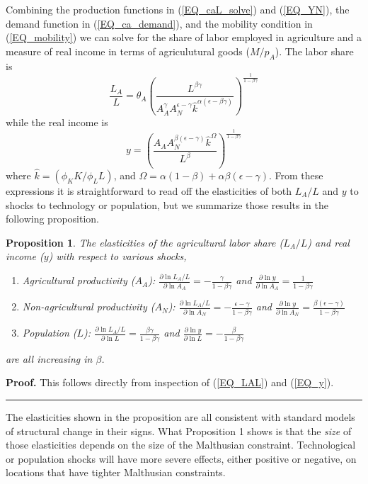 \documentclass[11pt]{article}
\newtheorem{proposition}{Proposition}
\newenvironment{proof}[1][Proof]{\noindent\textbf{#1.} }{\ \rule{0.5em}{0.5em}}
\begin{document}
Combining the production functions in (\ref{EQ_caL_solve}) and (\ref{EQ_YN}), the demand function in (\ref{EQ_ca_demand}), and the mobility condition in (\ref{EQ_mobility}) we can solve for the share of labor employed in agriculture and a measure of real income in terms of agriculutural goods ($M/p_A$). The labor share is
\begin{equation}
	\frac{L_A}{L} = \theta_A \left(\frac{L^{\beta\gamma}}{A_A^{\gamma} A_N^{\epsilon - \gamma} \hat{k}^{\alpha(\epsilon - \beta\gamma)}}\right)^{\frac{1}{1-\beta\gamma}} \label{EQ_LAL}
\end{equation}
while the real income is
\begin{equation}
	y = \left(\frac{A_A A_N^{\beta(\epsilon-\gamma)}\hat{k}^{\Omega}}{L^{\beta}} \right)^{\frac{1}{1-\beta\gamma}} \label{EQ_y}
\end{equation}
where $\hat{k} = (\phi_K K/\phi_L L)$, and $\Omega = \alpha(1-\beta) + \alpha\beta(\epsilon-\gamma)$. From these expressions it is straightforward to read off the elasticities of both $L_A/L$ and $y$ to shocks to technology or population, but we summarize those results in the following proposition. 

\begin{proposition}
The elasticities of the agricultural labor share ($L_A/L$) and real income ($y$) with respect to various shocks,
\begin{enumerate}
	\item[(a)] Agricultural productivity ($A_A$): $\frac{\partial \ln L_A/L}{\partial \ln A_A} = - \frac{\gamma}{1-\beta\gamma}$ and $\frac{\partial \ln y}{\partial \ln A_A} = \frac{1}{1-\beta\gamma}$
	\item[(b)] Non-agricultural productivity ($A_N$): $\frac{\partial \ln L_A/L}{\partial \ln A_N} = - \frac{\epsilon-\gamma}{1-\beta\gamma}$ and $\frac{\partial \ln y}{\partial \ln A_N} = \frac{\beta(\epsilon-\gamma)}{1-\beta\gamma}$
	\item[(c)] Population ($L$): $\frac{\partial \ln L_A/L}{\partial \ln L} = \frac{\beta\gamma}{1-\beta\gamma}$ and $\frac{\partial \ln y}{\partial \ln L} = - \frac{\beta}{1-\beta\gamma}$
\end{enumerate}
are all increasing in $\beta$.
\end{proposition}
\begin{proof}
This follows directly from inspection of (\ref{EQ_LAL}) and (\ref{EQ_y}).
\end{proof}

\vspace{.3cm} The elasticities shown in the proposition are all consistent with standard models of structural change \citep{kp2001,Gollin:2007oq,Restuccia:2008hc,Gollin:2010ys,vollrath2011,Alvarez-Cuadrado:2011nx,hrv2014,duarte2010role} in their signs. What Proposition 1 shows is that the \textit{size} of those elasticities depends on the size of the Malthusian constraint. Technological or population shocks will have more severe effects, either positive or negative, on locations that have tighter Malthusian constraints. 
\end{document}
